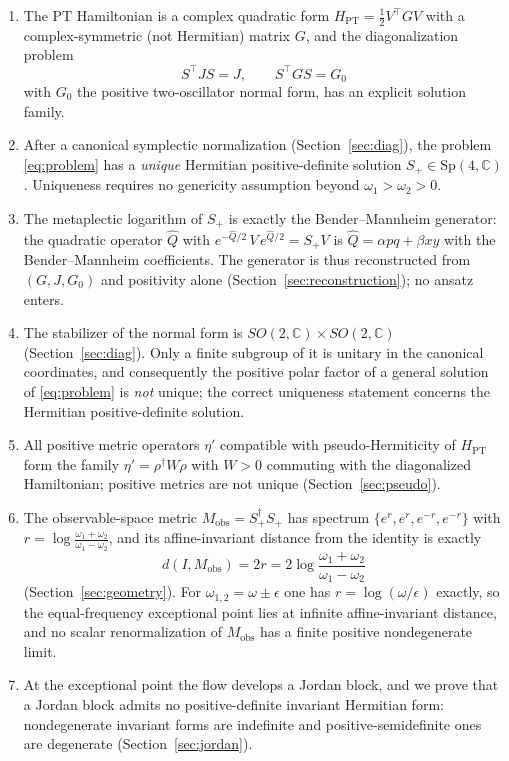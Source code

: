 \documentclass[11pt]{article}
\theoremstyle{definition}
\theoremstyle{remark}
\newcommand{\C}{\mathbb{C}}
\newcommand{\w}{\omega}
\newcommand{\Sp}{\mathrm{Sp}}
\newcommand{\Mobs}{M_{\mathrm{obs}}}
\newcommand{\dg}{\dagger}
\begin{document}
\begin{enumerate}
\item The PT Hamiltonian is a complex quadratic form
$H_{\mathrm{PT}}=\tfrac12 V^{\top}GV$ with a complex-symmetric (not Hermitian)
matrix $G$, and the diagonalization problem
\begin{equation}\label{eq:problem}
S^{\top}JS=J,\qquad S^{\top}GS=G_0
\end{equation}
with $G_0$ the positive two-oscillator normal form, has an explicit solution
family.

\item After a canonical symplectic normalization (Section~\ref{sec:diag}),
the problem \eqref{eq:problem} has a \emph{unique} Hermitian positive-definite
solution $S_+\in \Sp(4,\C)$.  Uniqueness requires no genericity assumption
beyond $\w_1>\w_2>0$.

\item The metaplectic logarithm of $S_+$ is exactly the Bender--Mannheim
generator: the quadratic operator $\widehat Q$ with
$e^{-\widehat Q/2}\,V\,e^{\widehat Q/2}=S_+V$ is
$\widehat Q=\alpha pq+\beta xy$ with the Bender--Mannheim coefficients.  The
generator is thus reconstructed from $(G,J,G_0)$ and positivity alone
(Section~\ref{sec:reconstruction}); no ansatz enters.

\item The stabilizer of the normal form is $SO(2,\C)\times SO(2,\C)$
(Section~\ref{sec:diag}).  Only a finite subgroup of it is unitary in the
canonical coordinates, and consequently the positive polar factor of a
general solution of \eqref{eq:problem} is \emph{not} unique; the correct
uniqueness statement concerns the Hermitian positive-definite solution.

\item All positive metric operators $\eta'$ compatible with
pseudo-Hermiticity of $H_{\mathrm{PT}}$ form the family
$\eta'=\rho^{\dg}W\rho$ with $W>0$ commuting with the diagonalized
Hamiltonian; positive metrics are not unique
(Section~\ref{sec:pseudo}).

\item The observable-space metric $\Mobs=S_+^{\dg}S_+$ has spectrum
$\{e^{r},e^{r},e^{-r},e^{-r}\}$ with
$r=\log\frac{\w_1+\w_2}{\w_1-\w_2}$, and its affine-invariant distance from
the identity is exactly
\begin{equation}
d(I,\Mobs)=2r=2\log\frac{\w_1+\w_2}{\w_1-\w_2}
\end{equation}
(Section~\ref{sec:geometry}).  For $\w_{1,2}=\w\pm\epsilon$ one has
$r=\log(\w/\epsilon)$ exactly, so the equal-frequency exceptional point lies
at infinite affine-invariant distance, and no scalar renormalization of
$\Mobs$ has a finite positive nondegenerate limit.

\item At the exceptional point the flow develops a Jordan block, and we prove
that a Jordan block admits no positive-definite invariant Hermitian form:
nondegenerate invariant forms are indefinite and positive-semidefinite ones
are degenerate (Section~\ref{sec:jordan}).
\end{enumerate}
\end{document}
